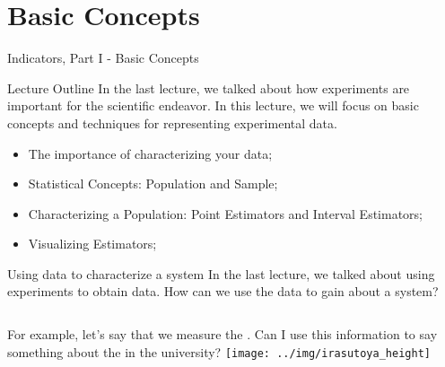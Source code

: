 
\section{Basic Concepts}
\begin{frame}
  \begin{center}
    Indicators, Part I - Basic Concepts
  \end{center}
\end{frame}

\begin{frame}{Lecture Outline}
  In the last lecture, we talked about how experiments are important for the scientific endeavor. In this lecture, we will focus on basic concepts and techniques for representing experimental data.\bigskip

  \begin{itemize}
    \item The importance of characterizing your data;
    \item Statistical Concepts: Population and Sample;
    \item Characterizing a Population: Point Estimators and Interval Estimators;
    \item Visualizing Estimators;
  \end{itemize}
\end{frame}




\begin{frame}{Using data to characterize a system}
  In the last lecture, we talked about using experiments to obtain data.
  How can we use the data to gain  about a system?
  \bigskip


  \begin{columns}
    For example, let's say that we measure the . Can I use this information to say something about the
     in the university?
    \texttt{[image: ../img/irasutoya\_height]}
  \end{columns}
\end{frame}

